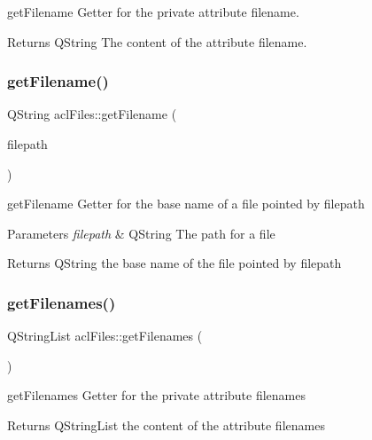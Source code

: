 get\+Filename Getter for the private attribute filename. 

\begin{DoxyReturn}{Returns}
Q\+String The content of the attribute filename. 
\end{DoxyReturn}
\mbox{\label{classaclFiles_a827c8b42e03850775de3feef9e14885d}} 
\subsubsection{\texorpdfstring{get\+Filename()}{getFilename()}\hspace{0.1cm}{\footnotesize\ttfamily [2/2]}}
{\footnotesize\ttfamily Q\+String acl\+Files\+::get\+Filename (\begin{DoxyParamCaption}\item[{Q\+String}]{filepath }\end{DoxyParamCaption})}



get\+Filename Getter for the base name of a file pointed by filepath 


\begin{DoxyParams}{Parameters}
{\em filepath} & Q\+String The path for a file \\
\hline
\end{DoxyParams}
\begin{DoxyReturn}{Returns}
Q\+String the base name of the file pointed by filepath 
\end{DoxyReturn}
\mbox{\label{classaclFiles_a5740e2ee3301c0ec790059dd2640c235}} 
\subsubsection{\texorpdfstring{get\+Filenames()}{getFilenames()}}
{\footnotesize\ttfamily Q\+String\+List acl\+Files\+::get\+Filenames (\begin{DoxyParamCaption}{ }\end{DoxyParamCaption})}



get\+Filenames Getter for the private attribute filenames 

\begin{DoxyReturn}{Returns}
Q\+String\+List the content of the attribute filenames 
\end{DoxyReturn}
\mbox{\label{classaclFiles_a9c7981b88715a060d0e93065fabd7dfc}} 
